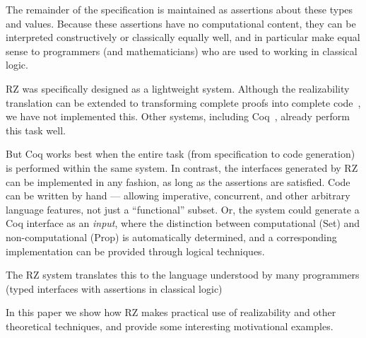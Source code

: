 The remainder of the specification is maintained as assertions about
these types and values. Because these assertions have no computational
content, they can be interpreted constructively or classically equally
well, and in particular make equal sense to programmers (and
mathematicians) who are used to working in classical logic.

\bigskip

RZ was specifically designed as a lightweight system. Although the
realizability translation can be extended to transforming complete
proofs into complete code~\cite{komagata+:tr95}, we have not
implemented this. Other systems, including Coq~\cite{coq}, already
perform this task well.

But Coq works best when the entire task (from specification to code
generation) is performed within the same system. In contrast, the
interfaces generated by RZ can be implemented in any fashion, as long
as the assertions are satisfied. Code can be written by hand ---
allowing imperative, concurrent, and other arbitrary language
features, not just a ``functional'' subset. Or, the system could
generate a Coq interface as an \emph{input}, where the distinction
between computational (Set) and non-computational (Prop) is
automatically determined, and a corresponding implementation can be
provided through logical techniques.


The RZ system translates this to the language understood by many
programmers (typed interfaces with assertions in classical logic)

\bigskip

In this paper we show how RZ makes practical use of realizability and
other theoretical techniques, and provide some interesting motivational
examples.


